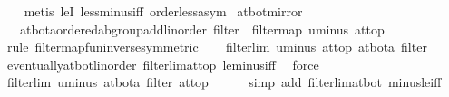 \begin{isabellebody}
\ \ \isamarkupfalse%
\ {\isacharparenleft}{\kern0pt}metis\ leI\ less{\isacharunderscore}{\kern0pt}minus{\isacharunderscore}{\kern0pt}iff\ order{\isacharunderscore}{\kern0pt}less{\isacharunderscore}{\kern0pt}asym{\isacharparenright}{\kern0pt}%
\endisatagproof
{\isafoldproof}%
%
\isadelimproof
\isanewline
%
\endisadelimproof
\isanewline
{}\isamarkupfalse%
\ at{\isacharunderscore}{\kern0pt}bot{\isacharunderscore}{\kern0pt}mirror\ {\isacharcolon}{\kern0pt}\isanewline
\ \ \ {\isachardoublequoteopen}{\isacharparenleft}{\kern0pt}at{\isacharunderscore}{\kern0pt}bot{\isacharcolon}{\kern0pt}{\isacharcolon}{\kern0pt}{\isacharparenleft}{\kern0pt}{\isacharprime}{\kern0pt}a{\isacharcolon}{\kern0pt}{\isacharcolon}{\kern0pt}{\isacharbraceleft}{\kern0pt}ordered{\isacharunderscore}{\kern0pt}ab{\isacharunderscore}{\kern0pt}group{\isacharunderscore}{\kern0pt}add{\isacharcomma}{\kern0pt}linorder{\isacharbraceright}{\kern0pt}\ filter{\isacharparenright}{\kern0pt}{\isacharparenright}{\kern0pt}\ {\isacharequal}{\kern0pt}\ filtermap\ uminus\ at{\isacharunderscore}{\kern0pt}top{\isachardoublequoteclose}\isanewline
%
\isadelimproof
%
\endisadelimproof
%
\isatagproof
{}\isamarkupfalse%
\ {\isacharparenleft}{\kern0pt}rule\ filtermap{\isacharunderscore}{\kern0pt}fun{\isacharunderscore}{\kern0pt}inverse{\isacharbrackleft}{\kern0pt}symmetric{\isacharbrackright}{\kern0pt}{\isacharparenright}{\kern0pt}\isanewline
\ \ \isamarkupfalse%
\ {\isachardoublequoteopen}filterlim\ uminus\ at{\isacharunderscore}{\kern0pt}top\ {\isacharparenleft}{\kern0pt}at{\isacharunderscore}{\kern0pt}bot{\isacharcolon}{\kern0pt}{\isacharcolon}{\kern0pt}{\isacharprime}{\kern0pt}a\ filter{\isacharparenright}{\kern0pt}{\isachardoublequoteclose}\isanewline
\ \ \ \ \isamarkupfalse%
\ eventually{\isacharunderscore}{\kern0pt}at{\isacharunderscore}{\kern0pt}bot{\isacharunderscore}{\kern0pt}linorder\ filterlim{\isacharunderscore}{\kern0pt}at{\isacharunderscore}{\kern0pt}top\ le{\isacharunderscore}{\kern0pt}minus{\isacharunderscore}{\kern0pt}iff\ \isamarkupfalse%
\ force\isanewline
\ \ \isamarkupfalse%
\ {\isachardoublequoteopen}filterlim\ uminus\ {\isacharparenleft}{\kern0pt}at{\isacharunderscore}{\kern0pt}bot{\isacharcolon}{\kern0pt}{\isacharcolon}{\kern0pt}{\isacharprime}{\kern0pt}a\ filter{\isacharparenright}{\kern0pt}\ at{\isacharunderscore}{\kern0pt}top{\isachardoublequoteclose}\isanewline
\ \ \ \ \isamarkupfalse%
\ {\isacharparenleft}{\kern0pt}simp\ add{\isacharcolon}{\kern0pt}\ filterlim{\isacharunderscore}{\kern0pt}at{\isacharunderscore}{\kern0pt}bot\ minus{\isacharunderscore}{\kern0pt}le{\isacharunderscore}{\kern0pt}iff{\isacharparenright}{\kern0pt}\isanewline

\end{isabellebody}
